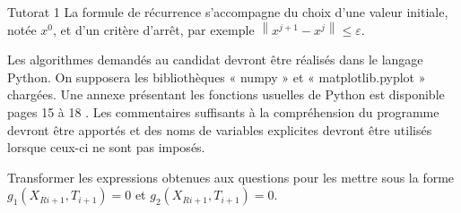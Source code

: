 \begin{exo}[PC][1][python]{Tutorat 1}
La formule de récurrence s'accompagne du choix d'une valeur initiale, notée \(x^{0}\), et d'un critère d'arrêt, par exemple \(\left\|x^{j+1}-x^{j}\right\| \leq \varepsilon\).

Les algorithmes demandés au candidat devront être réalisés dans le langage Python. On supposera les bibliothèques « numpy » et « matplotlib.pyplot » chargées. Une annexe présentant les fonctions usuelles de Python est disponible pages 15 à 18 . Les commentaires suffisants à la compréhension du programme devront être apportés et des noms de variables explicites devront être utilisés lorsque ceux-ci ne sont pas imposés.

\begin{quest}
  \item Transformer les expressions obtenues aux questions pour les mettre sous la forme \(g_{1}\left(X_{R i+1}, T_{i+1}\right)=0\) et \(g_{2}\left(X_{R i+1}, T_{i+1}\right)=0\).
  

\end{quest}
\end{exo}
